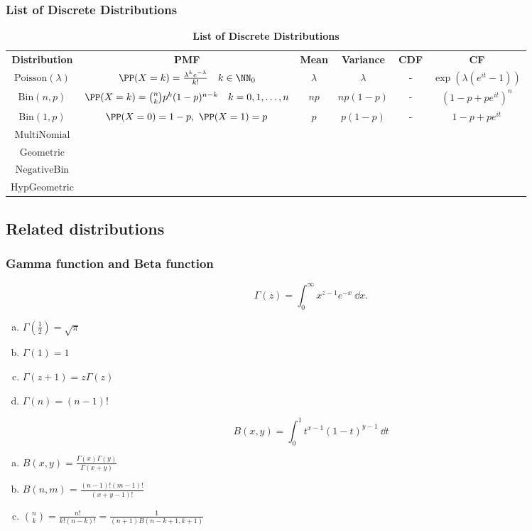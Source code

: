 \subsubsection{List of Discrete Distributions}
\begin{table}[h]
	\centering
\begin{tabular}{ c | c | c | c | c | c}
	\hline
	\textbf{Distribution}  & \textbf{PMF} & \textbf{Mean} &\textbf{Variance}& \textbf{CDF} & \textbf{CF}\\  
	$\mathrm{Poisson}(\lambda)$ & $\PP(X=k)= \frac{\lambda^k e^{-\lambda}}{k!} \quad k\in \NN_0$  & $\lambda$ & $\lambda$ & - & $\exp( \lambda( e^{it} -1 ) )$\\
	$\mathrm{Bin}(n,p)$ & $\PP(X=k) = \binom{n}{k} p^k (1-p)^{n-k}  \quad k=0,1,\dots,n$  & $np$ & $np(1-p)$ & - & $( 1 - p + pe^{it} )^n$ \\
	$\mathrm{Bin}(1,p)$ & $\PP(X=0) = 1-p,\ \PP(X=1) = p$ & $p$ & $p(1-p)$ & - & $1-p + pe^{it}$ \\
	$\mathrm{MultiNomial}$ & & & & & \\
	$\mathrm{Geometric}$ & & & & & \\
	$\mathrm{NegativeBin}$ & & & & & \\
	$\mathrm{HypGeometric}$ & & & & & \\
	\hline 
\end{tabular}
	\caption{\textbf{List of Discrete Distributions}}
	\label{tab:DiscreteDist}
\end{table}

\newpage
\subsection{Related distributions}
\subsubsection{Gamma function and Beta function}
\begin{prop}
	$$\Gamma(z) = \int^\infty_0 x^{z-1} e^{-x} \ \dd x.$$
	\begin{enumerate}[a)]
		\item $\Gamma(\frac{1}{2}) = \sqrt{\pi}$
		\item $\Gamma(1) = 1$
		\item $\Gamma(z + 1) = z \Gamma(z)$
		\item $\Gamma(n) = (n-1)!$
	\end{enumerate}
\end{prop}

\begin{prop}
	$$B(x,y) = \int^1_0 t^{x-1} (1-t)^{y-1} \ \dd t$$
	\begin{enumerate}[a)]
		\item $B(x,y) = \frac{\Gamma(x) \Gamma(y)}{\Gamma(x+y) }$
		\item $B(n,m) = \frac{ (n-1)!(m-1)! }{ (x+y-1)! }$
		\item $\binom{n}{k} = \frac{n!}{k! (n-k)!} = \frac{1}{ (n+1) B(n-k+1, k+1) }$
	\end{enumerate}
\end{prop}

